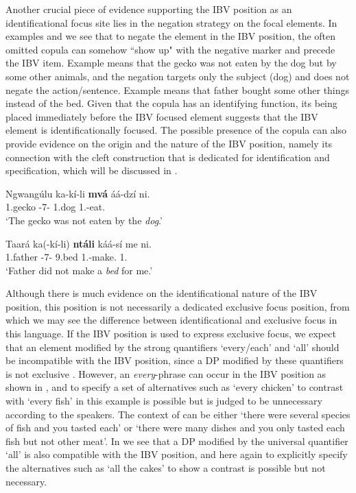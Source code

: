 \documentclass[output=paper,colorlinks,citecolor=brown,
]{langscibook}
\begin{document}
Another crucial piece of evidence supporting the IBV position as an identificational focus site lies in the negation strategy on the focal elements. In examples  and  we see that to negate the element in the IBV position, the often omitted copula can somehow ``show up" with the negative marker and precede the IBV item. Example  means that the gecko was not eaten by the dog but by some other animals, and the negation targets only the subject (dog) and does not negate the action/sentence. Example  means that father bought some other things instead of the bed. Given that the copula has an identifying function, its being placed immediately before the IBV focused element suggests that the IBV element is identificationally focused. The possible presence of the copula can also provide evidence on the origin and the nature of the IBV position, namely its connection with the cleft construction that is dedicated for identification and specification, which will be discussed in .
\begin{exe}
\ex
\label{82}
\gll
Ngwangúlu ka-kí-li \textbf{mvá} áá-dzí ni.\\
1.gecko \Neg{}-7\Sm{}-\Cop{} 1.dog 1\Sm{}.\Pst{}-eat.\Pst{} \Neg{}\\
\trans ‘The gecko was not eaten by the \textit{dog}.’

\end{exe}
\begin{exe}
\ex
\label{83}
\gll
Taará ka(-kí-li) \textbf{ntáli} káá-sí me ni.\\
1.father \Neg{}-7\Sm{}-\Cop{} 9.bed 1\Sm{}.\Pst{}-make.\Pst{} 1\Sg{}.\Pro{} \Neg{}\\
\trans ‘Father did not make a \textit{bed} for me.’

\end{exe}
Although there is much evidence on the identificational nature of the IBV position, this position is not necessarily a dedicated exclusive focus position, from which we may see the difference between identificational and exclusive focus in this language. If the IBV position is used to express exclusive focus, we expect that an element modified by the strong quantifiers `every/each' and `all' should be incompatible with the IBV position, since a DP modified by these quantifiers is not exclusive \citep{É.Kiss1998, vanderWal2009a, vanderWal2011, vanderWal2016}. However, an \textit{every}-phrase can occur in the IBV position as shown in , and to specify a set of alternatives such as `every chicken' to contrast with `every fish' in this example is possible but is judged to be unnecessary according to the speakers. The context of  can be either `there were several species of fish and you tasted each' or `there were many dishes and you only tasted each fish but not other meat'. In  we see that a DP modified by the universal quantifier `all' is also compatible with the IBV position, and here again to explicitly specify the alternatives such as `all the cakes' to show a contrast is possible but not necessary.
\end{document}
